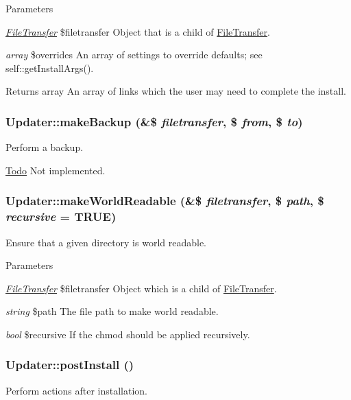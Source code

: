 \begin{DoxyParams}{Parameters}
\item[{\em \hyperlink{classFileTransfer}{FileTransfer}}]\$filetransfer Object that is a child of \hyperlink{classFileTransfer}{FileTransfer}. \item[{\em array}]\$overrides An array of settings to override defaults; see self::getInstallArgs().\end{DoxyParams}
\begin{DoxyReturn}{Returns}
array An array of links which the user may need to complete the install. 
\end{DoxyReturn}
\hypertarget{classUpdater_afdbf28100a8d3ed78cb97095fa221923}{
\subsubsection[{makeBackup}]{\setlength{\rightskip}{0pt plus 5cm}Updater::makeBackup (\&\$ {\em filetransfer}, \/  \$ {\em from}, \/  \$ {\em to})}}
\label{classUpdater_afdbf28100a8d3ed78cb97095fa221923}
Perform a backup.

\begin{Desc}
\item[\hyperlink{todo__todo000010}{Todo}]Not implemented. \end{Desc}
\hypertarget{classUpdater_a8218fada74db8a896a3a87ffc2d6f9bf}{
\subsubsection[{makeWorldReadable}]{\setlength{\rightskip}{0pt plus 5cm}Updater::makeWorldReadable (\&\$ {\em filetransfer}, \/  \$ {\em path}, \/  \$ {\em recursive} = {\ttfamily TRUE})}}
\label{classUpdater_a8218fada74db8a896a3a87ffc2d6f9bf}
Ensure that a given directory is world readable.


\begin{DoxyParams}{Parameters}
\item[{\em \hyperlink{classFileTransfer}{FileTransfer}}]\$filetransfer Object which is a child of \hyperlink{classFileTransfer}{FileTransfer}. \item[{\em string}]\$path The file path to make world readable. \item[{\em bool}]\$recursive If the chmod should be applied recursively. \end{DoxyParams}
\hypertarget{classUpdater_a5d46854a6a9fb7b22a71d6da5fdf0c8f}{
\subsubsection[{postInstall}]{\setlength{\rightskip}{0pt plus 5cm}Updater::postInstall ()}}
\label{classUpdater_a5d46854a6a9fb7b22a71d6da5fdf0c8f}
Perform actions after installation. 

